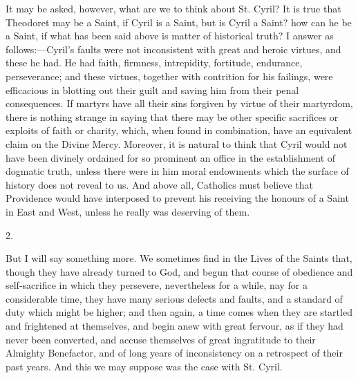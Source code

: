 It may be asked, however, what are we to think about St. Cyril? It
is true that Theodoret may be a Saint, if Cyril is a Saint, but is
Cyril a Saint? how can he be a Saint, if what has been said above is
matter of historical truth? I answer as follows:—Cyril's faults were
not inconsistent with great and heroic virtues, and these he had. He
had faith, firmness, intrepidity, fortitude, endurance, perseverance;
and these virtues, together with contrition for his failings, were
efficacious in blotting out their guilt and saving him from their
penal consequences. If martyrs have all their sins forgiven by virtue
of their martyrdom, there is nothing strange in saying that there may
be other specific sacrifices or exploits of faith or charity, which,
when found in combination, have an equivalent claim on the Divine
Mercy. Moreover, it is natural to think that Cyril would not
have been divinely ordained for so prominent an office in the
establishment of dogmatic truth, unless there were in him moral
endowments which the surface of history does not reveal to us. And
above all, Catholics must believe that Providence would have
interposed to prevent his receiving the honours of a Saint in East and
West, unless he really was deserving of them.

2.

But I will say something more. We sometimes find in the Lives of
the Saints that, though they have already turned to God, and begun
that course of obedience and self-sacrifice in which they persevere,
nevertheless for a while, nay for a considerable time, they have many
serious defects and faults, and a standard of duty which might be
higher; and then again, a time comes when they are startled and
frightened at themselves, and begin anew with great fervour, as if
they had never been converted, and accuse themselves of great
ingratitude to their Almighty Benefactor, and of long years of
inconsistency on a retrospect of their past years. And this we may
suppose was the case with St. Cyril.

